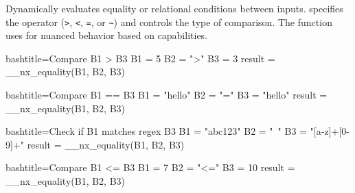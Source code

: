\begin{NexMainBox}
	\begin{NexMainBox}
		Dynamically evaluates equality or relational conditions between inputs.  specifies the operator (\texttt{>}, \texttt{<}, \texttt{=}, or \texttt{\textasciitilde}) and controls the type of comparison. The function uses  for nuanced behavior based on  capabilities.
	\end{NexMainBox}
	\begin{NexMainBox}
		\begin{NexListDark}
		\end{NexListDark}
	\end{NexMainBox}
\end{NexMainBox}

\begin{NexCodeBox}{bash}{title={Compare B1 > B3}}
	B1 = 5
	B2 = ">"
	B3 = 3
	result = __nx_equality(B1, B2, B3)
\end{NexCodeBox}

\begin{NexCodeBox}{bash}{title={Compare B1 == B3}}
	B1 = "hello"
	B2 = "="
	B3 = "hello"
	result = __nx_equality(B1, B2, B3)
\end{NexCodeBox}

\begin{NexCodeBox}{bash}{title={Check if B1 matches regex B3}}
	B1 = "abc123"
	B2 = "~"
	B3 = "[a-z]+[0-9]+"
	result = __nx_equality(B1, B2, B3)
\end{NexCodeBox}

\begin{NexCodeBox}{bash}{title={Compare B1 <= B3}}
	B1 = 7
	B2 = "<="
	B3 = 10
	result = __nx_equality(B1, B2, B3)
\end{NexCodeBox}

